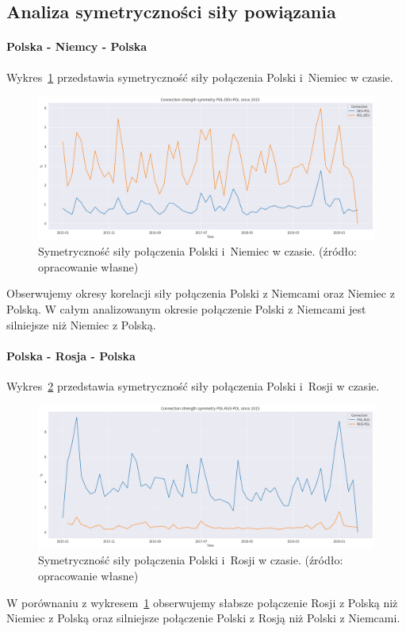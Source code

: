 \documentclass[11pt]{report}
\begin{document}
    \subsection{Analiza symetryczności siły powiązania}

    \paragraph{Polska - Niemcy - Polska}

    Wykres~\ref{fig:POL-DEU-POL} przedstawia symetryczność siły połączenia Polski i~Niemiec w czasie.
    \begin{figure}[!htp]
        \centering
        \includegraphics[width=\linewidth]{fig/ConnectionSymmetry/POL-DEU-POL.png}
        \caption{Symetryczność siły połączenia Polski i~Niemiec w czasie. (źródło: opracowanie własne)}
        \label{fig:POL-DEU-POL}
    \end{figure}
    Obserwujemy okresy korelacji siły połączenia Polski z Niemcami oraz Niemiec z Polską.
    W całym analizowanym okresie połączenie Polski z Niemcami jest silniejsze niż Niemiec z Polską.

    \paragraph{Polska - Rosja - Polska}

    Wykres~\ref{fig:POL-RUS-POL} przedstawia symetryczność siły połączenia Polski i~Rosji w czasie.
    \begin{figure}[!htp]
        \centering
        \includegraphics[width=\linewidth]{fig/ConnectionSymmetry/POL-RUS-POL.png}
        \caption{Symetryczność siły połączenia Polski i~Rosji w czasie. (źródło: opracowanie własne)}
        \label{fig:POL-RUS-POL}
    \end{figure}
    W porównaniu z wykresem~\ref{fig:POL-DEU-POL} obserwujemy słabsze połączenie Rosji z Polską niż Niemiec z Polską oraz silniejsze połączenie Polski z Rosją niż Polski z Niemcami.
\end{document}
